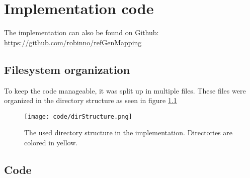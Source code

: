 \chapter{Implementation code}

The implementation can also be found on Github: \href{https://github.com/robinno/refGenMapping}{https://github.com/robinno/refGenMapping}

\section{Filesystem organization}

To keep the code manageable, it was split up in multiple files. These files were organized in the directory structure as seen in figure \ref{fig:dirStruct}

\begin{figure}[H]
	\centering
	\texttt{[image: code/dirStructure.png]}
	\caption{The used directory structure in the implementation. Directories are colored in yellow.}
	\label{fig:dirStruct}
\end{figure}

\section{Code}

